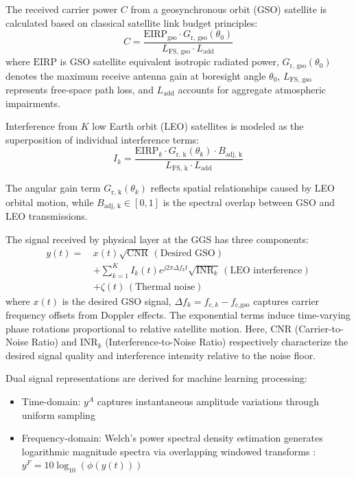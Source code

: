\documentclass[conference]{IEEEtran}
\begin{document}
The received carrier power $C$ from a geosynchronous orbit (GSO) satellite is calculated based on classical satellite link budget principles:
\begin{equation}
    C = \frac{\text{EIRP}_{\text{gso}} \cdot G_{\text{r, gso}}(\theta_0)}{L_{\text{FS, gso}} \cdot L_{\text{add}}}
    \label{eq:carrier_power}
\end{equation}
where $\text{EIRP}$ is GSO satellite equivalent isotropic radiated power, $G_{\text{r, gso}}(\theta_0)$ denotes the maximum receive antenna gain at boresight angle $\theta_0$, $L_{\text{FS, gso}}$ represents free-space path loss, and $L_{\text{add}}$ accounts for aggregate atmospheric impairments.

Interference from $K$ low Earth orbit (LEO) satellites is modeled as the superposition of individual interference terms:
\begin{equation}
    I_k = \frac{\text{EIRP}_k \cdot G_{\text{r, k}}(\theta_k) \cdot B_{\text{adj, k}}}{L_{\text{FS, k}} \cdot L_{\text{add}}}
    \label{eq:interference_power}
\end{equation}

The angular gain term $G_{\text{r, k}}(\theta_k)$ reflects spatial relationships caused by LEO orbital motion, while $B_{\text{adj, k}} \in [0,1]$ is the spectral overlap between GSO and LEO transmissions.

The signal received by physical layer at the GGS has three components:
\begin{align}
    y(t) =\, & x(t)\sqrt{\text{CNR}}\, (\text{Desired GSO}) \nonumber                                                 \\[0.5em]
             & + \sum_{k=1}^{K} I_k(t)e^{j2\pi \Delta f_k t}\sqrt{\text{INR}_k}\, (\text{LEO interference}) \nonumber \\[0.5em]
             & + \zeta(t)\, (\text{Thermal noise})
\end{align}
where $x(t)$  is the desired GSO signal, $\Delta f_k = f_{\text{c},k} - f_{\text{c,gso}}$ captures carrier frequency offsets from Doppler effects. The exponential terms induce time-varying phase rotations proportional to relative satellite motion. Here, $\text{CNR}$ (Carrier-to-Noise Ratio) and $\text{INR}_k$ (Interference-to-Noise Ratio) respectively characterize the desired signal quality and interference intensity relative to the noise floor.

Dual signal representations are derived for machine learning processing:
\begin{itemize}
    \item Time-domain: $y^A$ captures instantaneous amplitude variations through uniform sampling
    \item Frequency-domain: Welch's power spectral density estimation generates logarithmic magnitude spectra via overlapping windowed transforms \cite{saifaldawlaGenAIBasedModelsNGSO2024}: $y^F = 10\log_{10}(\phi(y(t)))$
\end{itemize}
\end{document}
